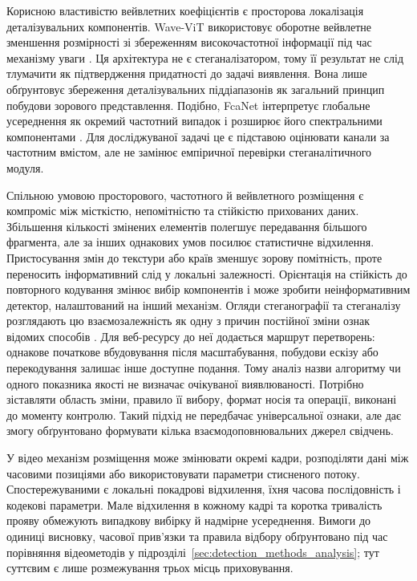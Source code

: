 Корисною властивістю вейвлетних коефіцієнтів є просторова локалізація деталізувальних компонентів. Wave-ViT використовує оборотне вейвлетне зменшення розмірності зі збереженням високочастотної інформації під час механізму уваги \cite{yao2022wavevit}. Ця архітектура не є стеганалізатором, тому її результат не слід тлумачити як підтвердження придатності до задачі виявлення. Вона лише обґрунтовує збереження деталізувальних піддіапазонів як загальний принцип побудови зорового представлення. Подібно, FcaNet інтерпретує глобальне усереднення як окремий частотний випадок і розширює його спектральними компонентами \cite{qin2021fcanet}. Для досліджуваної задачі це є підставою оцінювати канали за частотним вмістом, але не замінює емпіричної перевірки стеганалітичного модуля.

Спільною умовою просторового, частотного й вейвлетного розміщення є компроміс між місткістю, непомітністю та стійкістю прихованих даних. Збільшення кількості змінених елементів полегшує передавання більшого фрагмента, але за інших однакових умов посилює статистичне відхилення. Пристосування змін до текстури або країв зменшує зорову помітність, проте переносить інформативний слід у локальні залежності. Орієнтація на стійкість до повторного кодування змінює вибір компонентів і може зробити неінформативним детектор, налаштований на інший механізм. Огляди стеганографії та стеганалізу розглядають цю взаємозалежність як одну з причин постійної зміни ознак відомих способів \cite{muralidharan2022race,apau2024review,kheddar2024review}. Для веб-ресурсу до неї додається маршрут перетворень: однакове початкове вбудовування після масштабування, побудови ескізу або перекодування залишає інше доступне подання. Тому аналіз назви алгоритму чи одного показника якості не визначає очікуваної виявлюваності. Потрібно зіставляти область зміни, правило її вибору, формат носія та операції, виконані до моменту контролю. Такий підхід не передбачає універсальної ознаки, але дає змогу обґрунтовано формувати кілька взаємодоповнювальних джерел свідчень.

У відео механізм розміщення може змінювати окремі кадри, розподіляти дані між часовими позиціями або використовувати параметри стисненого потоку. Спостережуваними є локальні покадрові відхилення, їхня часова послідовність і кодекові параметри. Мале відхилення в кожному кадрі та коротка тривалість прояву обмежують випадкову вибірку й надмірне усереднення. Вимоги до одиниці висновку, часової прив’язки та правила відбору обґрунтовано під час порівняння відеометодів у підрозділі~\ref{sec:detection_methods_analysis}; тут суттєвим є лише розмежування трьох місць приховування.

